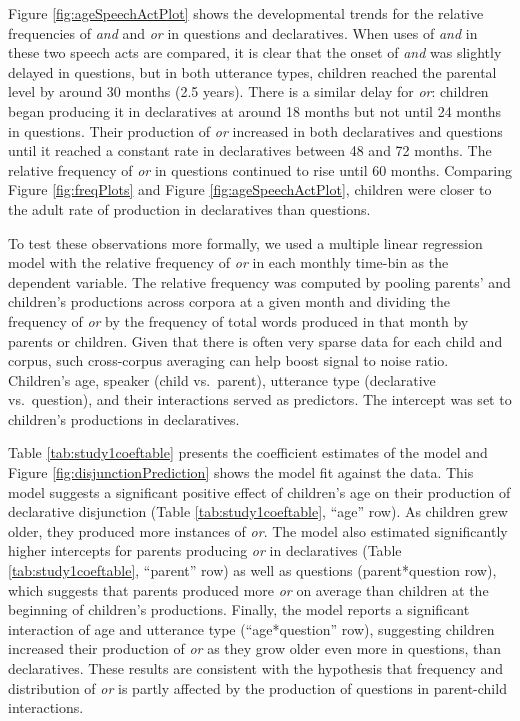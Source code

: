 \documentclass[
  ,man,floatsintext]{apa6}
\begin{document}
Figure \ref{fig:ageSpeechActPlot} shows the developmental trends for the relative frequencies of \emph{and} and \emph{or} in questions and declaratives. When uses of \emph{and} in these two speech acts are compared, it is clear that the onset of \emph{and} was slightly delayed in questions, but in both utterance types, children reached the parental level by around 30 months (2.5 years). There is a similar delay for \emph{or}: children began producing it in declaratives at around 18 months but not until 24 months in questions. Their production of \emph{or} increased in both declaratives and questions until it reached a constant rate in declaratives between 48 and 72 months. The relative frequency of \emph{or} in questions continued to rise until 60 months. Comparing Figure \ref{fig:freqPlots} and Figure \ref{fig:ageSpeechActPlot}, children were closer to the adult rate of production in declaratives than questions.

To test these observations more formally, we used a multiple linear regression model with the relative frequency of \emph{or} in each monthly time-bin as the dependent variable. The relative frequency was computed by pooling parents' and children's productions across corpora at a given month and dividing the frequency of \emph{or} by the frequency of total words produced in that month by parents or children. Given that there is often very sparse data for each child and corpus, such cross-corpus averaging can help boost signal to noise ratio. Children's age, speaker (child vs.~parent), utterance type (declarative vs.~question), and their interactions served as predictors. The intercept was set to children's productions in declaratives.

Table \ref{tab:study1coeftable} presents the coefficient estimates of the model and Figure \ref{fig:disjunctionPrediction} shows the model fit against the data. This model suggests a significant positive effect of children's age on their production of declarative disjunction (Table \ref{tab:study1coeftable}, ``age'' row). As children grew older, they produced more instances of \emph{or}. The model also estimated significantly higher intercepts for parents producing \emph{or} in declaratives (Table \ref{tab:study1coeftable}, ``parent'' row) as well as questions (parent*question row), which suggests that parents produced more \emph{or} on average than children at the beginning of children's productions. Finally, the model reports a significant interaction of age and utterance type (``age*question'' row), suggesting children increased their production of \emph{or} as they grow older even more in questions, than declaratives. These results are consistent with the hypothesis that frequency and distribution of \emph{or} is partly affected by the production of questions in parent-child interactions.
\end{document}
